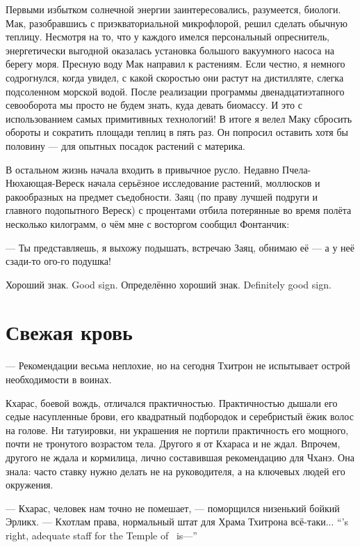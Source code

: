 Первыми избытком солнечной энергии заинтересовались, разумеется, биологи.
Мак, разобравшись с приэкваториальной микрофлорой, решил сделать обычную теплицу.
Несмотря на то, что у каждого имелся персональный опреснитель, энергетически выгодной оказалась установка большого вакуумного насоса на берегу моря.
Пресную воду Мак направил к растениям.
Если честно, я немного содрогнулся, когда увидел, с какой скоростью они растут на дистилляте, слегка подсоленном морской водой.
После реализации программы двенадцатиэтапного севооборота мы просто не будем знать, куда девать биомассу.
И это с использованием самых примитивных технологий!
В итоге я велел Маку сбросить обороты и сократить площади теплиц в пять раз.
Он попросил оставить хотя бы половину --- для опытных посадок растений с материка.

В остальном жизнь начала входить в привычное русло.
Недавно Пчела-Нюхающая-Вереск начала серьёзное исследование растений, моллюсков и ракообразных на предмет съедобности.
Заяц (по праву лучшей подруги и главного подопытного Вереск) с процентами отбила потерянные во время полёта несколько килограмм, о чём мне с восторгом сообщил Фонтанчик:

--- Ты представляешь, я выхожу подышать, встречаю Заяц, обнимаю её --- а у неё сзади-то ого-го подушка!

{Хороший знак.}
{Good sign.}
{Определённо хороший знак.}
{Definitely good sign.}

\section{Свежая кровь}

--- Рекомендации весьма неплохие, но на сегодня Тхитрон не испытывает острой необходимости в воинах.

Кхарас, боевой вождь, отличался практичностью.
Практичностью дышали его седые насупленные брови, его квадратный подбородок и серебристый ёжик волос на голове.
Ни татуировки, ни украшения не портили практичность его мощного, почти не тронутого возрастом тела.
Другого я от Кхараса и не ждал.
Впрочем, другого не ждала и кормилица, лично составившая рекомендацию для Чханэ.
Она знала: часто ставку нужно делать не на руководителя, а на ключевых людей его окружения.

--- Кхарас, человек нам точно не помешает, --- поморщился низенький бойкий Эрликх.
{--- Кхотлам права, нормальный штат для Храма Тхитрона всё-таки...}
{``\Kchotlam's right, adequate staff for the Temple of \Tchitron\ is---''}

